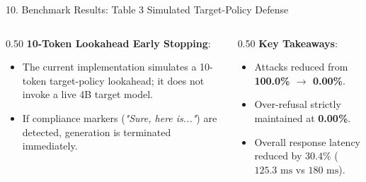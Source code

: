 \documentclass[aspectratio=169, 10pt]{beamer}
\begin{document}
\begin{frame}{10. Benchmark Results: Table 3 Simulated Target-Policy Defense}
    \begin{table}[h]
        \centering
        \caption{\textbf{Table 3: Simulated Target-Policy End-to-End Defense}}
    \end{table}

    \begin{columns}[T]
        \begin{column}{0.50\textwidth}
            \textbf{10-Token Lookahead Early Stopping}:
            \begin{itemize}
                \item The current implementation simulates a 10-token target-policy lookahead; it does not invoke a live 4B target model.
                \item If compliance markers (\textit{"Sure, here is..."}) are detected, generation is terminated immediately.
            \end{itemize}
        \end{column}
        \begin{column}{0.50\textwidth}
            \textbf{Key Takeaways}:
            \begin{itemize}
                \item Attacks reduced from \textbf{100.0\% $\to$ 0.00\%}.
                \item Over-refusal strictly maintained at \textbf{0.00\%}.
                \item Overall response latency reduced by $\mathbf{30.4\%}$ ($125.3\text{ ms}$ vs $180\text{ ms}$).
            \end{itemize}
        \end{column}
    \end{columns}
\end{frame}
\end{document}
